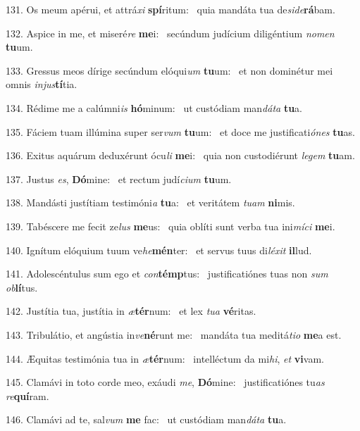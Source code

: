 131. Os meum apérui, et attrá\textit{xi} \textbf{spí}ritum: \ast\  quia mandáta tua de\textit{si}\textit{de}\textbf{rá}bam.\

132. Aspice in me, et miseré\textit{re} \textbf{me}i: \ast\  secúndum judícium diligéntium \textit{no}\textit{men} \textbf{tu}um.\

133. Gressus meos dírige secúndum elóqui\textit{um} \textbf{tu}um: \ast\  et non dominétur mei omnis \textit{in}\textit{jus}\textbf{tí}tia.\

134. Rédime me a calúmni\textit{is} \textbf{hó}minum: \ast\  ut custódiam man\textit{dá}\textit{ta} \textbf{tu}a.\

135. Fáciem tuam illúmina super ser\textit{vum} \textbf{tu}um: \ast\  et doce me justificati\textit{ó}\textit{nes} \textbf{tu}as.\

136. Exitus aquárum deduxérunt ócu\textit{li} \textbf{me}i: \ast\  quia non custodiérunt \textit{le}\textit{gem} \textbf{tu}am.\

137. Justus \textit{es}, \textbf{Dó}mine: \ast\  et rectum judí\textit{ci}\textit{um} \textbf{tu}um.\

138. Mandásti justítiam testimóni\textit{a} \textbf{tu}a: \ast\  et veritátem \textit{tu}\textit{am} \textbf{ni}mis.\

139. Tabéscere me fecit ze\textit{lus} \textbf{me}us: \ast\  quia oblíti sunt verba tua ini\textit{mí}\textit{ci} \textbf{me}i.\

140. Ignítum elóquium tuum ve\textit{he}\textbf{mén}ter: \ast\  et servus tuus di\textit{lé}\textit{xit} \textbf{il}lud.\

141. Adolescéntulus sum ego et \textit{con}\textbf{témp}tus: \ast\  justificatiónes tuas non \textit{sum} \textit{ob}\textbf{lí}tus.\

142. Justítia tua, justítia in \textit{æ}\textbf{tér}num: \ast\  et lex \textit{tu}\textit{a} \textbf{vé}ritas.\

143. Tribulátio, et angústia in\textit{ve}\textbf{né}runt me: \ast\  mandáta tua meditá\textit{ti}\textit{o} \textbf{me}a est.\

144. Æquitas testimónia tua in \textit{æ}\textbf{tér}num: \ast\  intelléctum da mi\textit{hi}, \textit{et} \textbf{vi}vam.\

145. Clamávi in toto corde meo, exáudi \textit{me}, \textbf{Dó}mine: \ast\  justificatiónes tu\textit{as} \textit{re}\textbf{quí}ram.\

146. Clamávi ad te, sal\textit{vum} \textbf{me} fac: \ast\  ut custódiam man\textit{dá}\textit{ta} \textbf{tu}a.\

